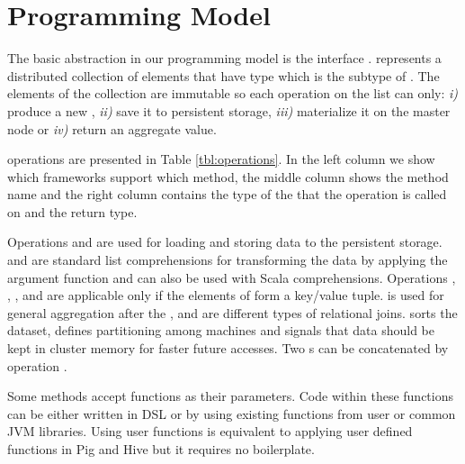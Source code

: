 \section{Programming Model}
\label{sec:programming-model}

The basic abstraction in our programming model is the interface .  represents a distributed collection of elements that have type  which is the subtype of . The elements of the  collection are immutable so each operation on the list can only: \emph{i)} produce a new , \emph{ii)} save it to persistent storage, \emph{iii)} materialize it on the master node or \emph{iv)} return an aggregate value. 

 operations are presented in Table \ref{tbl:operations}. In the left column we show which frameworks support which method, the middle column shows the method name and the right column contains the type of the  that the operation is called on and the return type. 

Operations  and  are used for loading and storing data to the persistent storage.  and  are standard list comprehensions for transforming the data by applying the argument function and can also be used with Scala  comprehensions. Operations , , ,  and  are applicable only if the elements of  form a key/value tuple.  is used for general aggregation after the ,  and  are different types of relational joins.  sorts the dataset,  defines partitioning among machines and  signals that data should be kept in cluster memory for faster future accesses. Two s can be concatenated by operation \code{++}.

Some methods accept functions as their parameters. Code within these functions can be either written in \tool DSL or by using existing functions from user or common JVM libraries. Using user functions is equivalent to applying user defined functions in Pig and Hive but it requires no boilerplate.  

